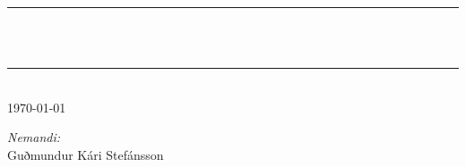 
\begin{titlepage}

\begin{center}






	\rule{\linewidth}{0.5mm}\\[0.4cm]
	{ \huge \bfseries <+Nafn+>\\[0.4cm]}
	{\Large \bfseries }
	\rule{\linewidth}{0.5mm}\\[1.5cm]


	\normalsize{\today}
	\vfill




	\begin{minipage}[t]{0.4\textwidth}
		\begin{flushleft} \normalsize
		\end{flushleft}
	\end{minipage}
	\begin{minipage}[t]{0.4\textwidth}
		\begin{flushright} \normalsize
			\emph{Nemandi:} \\
			Guðmundur Kári Stefánsson
		\end{flushright}
	\end{minipage}



	\end{center}

\end{titlepage}
